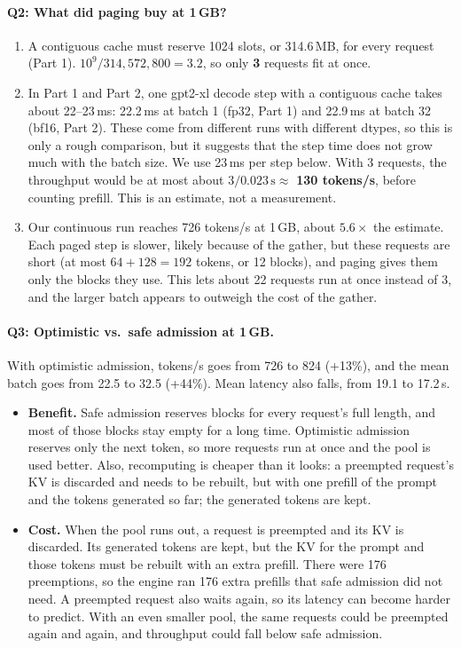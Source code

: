 \documentclass[10pt]{article}
\begin{document}
\paragraph{Q2: What did paging buy at 1\,GB?}
\begin{enumerate}
\item A contiguous cache must reserve 1024 slots, or 314.6\,MB, for every
  request (Part 1). $10^9 / 314{,}572{,}800 = 3.2$, so only \textbf{3}
  requests fit at once.
\item In Part 1 and Part 2, one gpt2-xl decode step with a contiguous
  cache takes about 22--23\,ms: 22.2\,ms at batch 1 (fp32, Part 1) and
  22.9\,ms at batch 32 (bf16, Part 2). These come from different runs
  with different dtypes, so this is only a rough comparison, but it
  suggests that the step time does not grow much with the batch size.
  We use 23\,ms per step below. With 3 requests, the
  throughput would be at most about
  $3 / 0.023\,\text{s} \approx$ \textbf{130 tokens/s}, before counting
  prefill. This is an estimate, not a measurement.
\item Our continuous run reaches 726 tokens/s at 1\,GB, about
  $5.6\times$ the estimate. Each paged step is slower, likely because of the
  gather, but these requests are short (at most $64 + 128 = 192$ tokens,
  or 12 blocks), and paging gives them only the blocks they use. This
  lets about 22 requests run at once instead of 3, and the larger batch
  appears to outweigh the cost of the gather.
\end{enumerate}

\paragraph{Q3: Optimistic vs.\ safe admission at 1\,GB.}
With optimistic admission, tokens/s goes from 726 to 824 (+13\%), and
the mean batch goes from 22.5 to 32.5 (+44\%). Mean latency also falls,
from 19.1 to 17.2\,s.
\begin{itemize}
\item \textbf{Benefit.} Safe admission reserves blocks for every
  request's full length, and most of those blocks stay empty for a long
  time. Optimistic admission reserves only the next token, so more
  requests run at once and the pool is used better. Also, recomputing is 
  cheaper than it looks: a preempted request's KV is discarded and needs to be rebuilt, but
  with one prefill of the prompt and the tokens generated so far; the generated tokens are kept.
\item \textbf{Cost.} When the pool runs out, a request is preempted and
  its KV is discarded. Its generated tokens are kept, but the KV for the
  prompt and those tokens must be rebuilt with an extra prefill. There
  were 176 preemptions, so the engine ran 176 extra prefills that safe
  admission did not need. A preempted request also waits again, so its latency can become harder
  to predict. With an even smaller pool, the same requests could be
  preempted again and again, and throughput could fall below safe
  admission.
\end{itemize}
\end{document}
